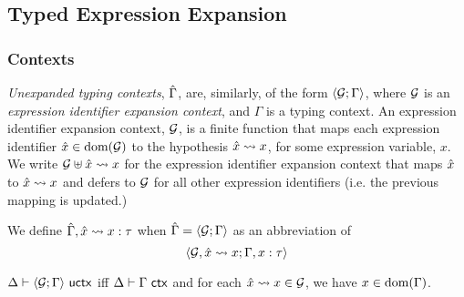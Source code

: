 \subsection{Typed Expression Expansion}\label{appendix:typed-expression-expansion-S}
\subsubsection{Contexts}
\emph{Unexpanded typing contexts}, $\hat{\Gamma}$, are, similarly, of the form $\langle \mathcal{G}; \Gamma \rangle$, where $\mathcal{G}$ is an \emph{expression identifier expansion context}, and $\Gamma$ is a typing context. An expression identifier expansion context, $\mathcal{G}$, is a finite function that maps each expression identifier ${\hat x} \in \text{dom}(\mathcal{G})$ to the hypothesis ${\hat x} \leadsto x$, for some expression variable, $x$. We write $\mathcal{G} \uplus {\hat x} \leadsto x$ for the expression identifier expansion context that maps ${\hat x}$ to ${\hat x} \leadsto x$ and defers to $\mathcal{G}$ for all other expression identifiers (i.e. the previous mapping is updated.) 

We define $\hat{\Gamma}, {\hat x} \leadsto x : \tau$ when $\hat{\Gamma} = \langle \mathcal{G}; \Gamma \rangle$ as an abbreviation of \[\langle \mathcal{G}, {\hat x} \leadsto x; \Gamma, x : \tau \rangle\]

\begin{definition} $\Delta \vdash \langle \mathcal{G}; \Gamma \rangle~\mathsf{uctx}$ iff $\Delta \vdash \Gamma~\mathsf{ctx}$ and for each ${\hat x} \leadsto x \in \mathcal{G}$, we have $x \in \text{dom}(\Gamma)$.\end{definition}


